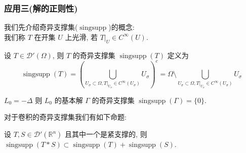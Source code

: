 \documentclass[11pt]{ctexart}[UTF8]
\begin{document}
\subsubsection*{应用三(解的正则性)}
我们先介绍奇异支撑集($\operatorname{singsupp}$)的概念:\\
我们称 $T$ 在开集 $U$ 上光滑, 若 $T|_U \in C^{\infty}(U)$.
\begin{definition}[奇异支撑集]
    设 $T \in \mathscr{D}'(\Omega)$, 则 $T$ 的奇异支撑集 $\operatorname{singsupp}(T)$ 定义为
    \begin{equation*}
        \operatorname{singsupp}(T) = \left(\bigcup_{U_{\sigma}\subset \Omega, T|_{U_{\sigma}} \in C^{\infty}(U_{\sigma})} U_{\sigma}\right)^{c} = \Omega \setminus \bigcup_{U_{\sigma}\subset \Omega, T|_{U_{\sigma}} \in C^{\infty}(U_{\sigma})} U_{\sigma}
    \end{equation*}
\end{definition}
\begin{example}
    $L_{0} = -\Delta$ 则 $L_{0}$ 的基本解 $\Gamma$ 的奇异支撑集 $\operatorname{singsupp}(\Gamma) = \{0\}$.
\end{example}
对于卷积的奇异支撑集我们有如下命题:
\begin{proposition}
    设 $T, S \in \mathscr{D}'(\mathbb{R}^{n})$ 且其中一个是紧支撑的, 则 $\operatorname{singsupp}(T * S) \subset \operatorname{singsupp}(T) + \operatorname{singsupp}(S)$.
\end{proposition}
\end{document}
